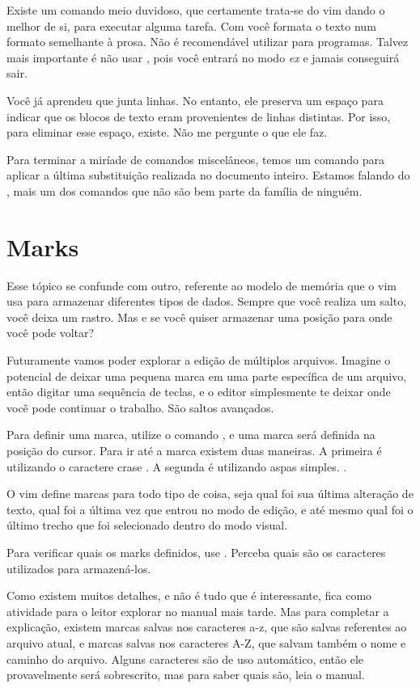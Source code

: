 Existe um comando meio duvidoso, que certamente trata-se do vim dando o melhor
de si, para executar alguma tarefa. Com  você formata o texto num formato
semelhante à prosa. Não é recomendável utilizar para programas.
Talvez mais importante é não usar , pois você entrará no modo \emph{ex} e jamais conseguirá sair.

Você já aprendeu que  junta linhas.
No entanto, ele preserva um espaço para indicar que os blocos de texto eram provenientes de linhas distintas.
Por isso, para eliminar esse espaço,  existe.
Não me pergunte o que ele faz.

Para terminar a miríade de comandos miscelâneos,
temos um comando para aplicar a última substituição realizada no documento inteiro.
Estamos falando do , mais um dos comandos que não são bem parte da família de ninguém.

\section{Marks}
Esse tópico se confunde com outro, referente ao modelo de memória que o vim usa para armazenar diferentes tipos de dados.
Sempre que você realiza um salto, você deixa um rastro.
Mas e se você quiser armazenar uma posição para onde você pode voltar?

Futuramente vamos poder explorar a edição de múltiplos arquivos.
Imagine o potencial de deixar uma pequena marca em uma parte específica de um arquivo,
então digitar uma sequência de teclas, e o editor simplesmente te deixar onde você pode continuar o trabalho.
São saltos avançados.

Para definir uma marca, utilize o comando , e uma marca será definida na posição do cursor.
Para ir até a marca existem duas maneiras.
A primeira é utilizando o caractere crase \vimcommand{\`}.
A segunda é utilizando aspas simples. .

O vim define marcas para todo tipo de coisa, seja qual foi sua última alteração de texto,
qual foi a última vez que entrou no modo de edição,
e até mesmo qual foi o último trecho que foi selecionado dentro do modo visual.

Para verificar quais os marks definidos, use . Perceba quais são os caracteres utilizados para armazená-los.

Como existem muitos detalhes, e não é tudo que é interessante, fica como atividade para o leitor explorar no manual mais tarde.
Mas para completar a explicação, existem marcas salvas nos caracteres a-z, 
que são salvas referentes ao arquivo atual, e marcas salvas nos caracteres A-Z,
que salvam também o nome e caminho do arquivo.
Alguns caracteres são de uso automático, então ele provavelmente será sobrescrito, mas para saber quais são, leia o manual.


\newpage
